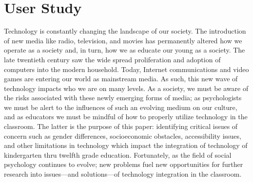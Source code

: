 \chapter{User Study}
Technology is constantly changing the landscape of our society.  The introduction of new media like radio, television, and movies has permanently altered how we operate as a society and, in turn, how we as educate our young as a society.  The late twentieth century saw the wide spread proliferation and adoption of computers into the modern household.  Today, Internet communications and video games are entering our world as mainstream media.  As such, this new wave of technology impacts who we are on many levels. As a society, we must be aware of the risks associated with these newly emerging forms of media; as psychologists we must be alert to the influences of such an evolving medium on our culture, and as educators we must be mindful of how to properly utilize technology in the classroom.  The latter is the purpose of this paper: identifying critical issues of concern such as gender differences, socioeconomic obstacles, accessibility issues, and other limitations in technology which impact the integration of technology of kindergarten thru twelfth grade education. Fortunately, as the field of social psychology continues to evolve; new problems fuel new opportunities for further research into issues—and solutions—of technology integration in the classroom. 

